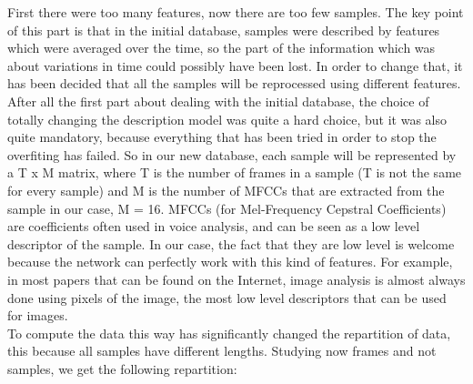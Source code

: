 \documentclass{report}
\begin{document}
	First there were too many features, now there are too few samples. The key point of this part is that in the initial database, samples were described by features which were averaged over the time, so the part of the information which was about variations in time could possibly have been lost. In order to change that, it has been decided that all the samples will be reprocessed using different features. After all the first part about dealing with the initial database, the choice of totally changing the description model was quite a hard choice, but it was also quite mandatory, because everything that has been tried in order to stop the overfiting has failed. So in our new database, each sample will be represented by a T x M matrix, where T is the number of frames in a sample (T is not the same for every sample) and M is the number of MFCCs that are extracted from the sample in our case, M = 16. MFCCs (for Mel-Frequency Cepstral Coefficients) are coefficients often used in voice analysis, and can be seen as a low level descriptor of the sample. In our case, the fact that they are low level is welcome because the network can perfectly work with this kind of features. For example, in most papers that can be found on the Internet, image analysis is almost always done using pixels of the image, the most low level descriptors that can be used for images.\\
	
	To compute the data this way has significantly changed the repartition of data, this because all samples have different lengths. Studying now frames and not samples, we get the following repartition:
	
\end{document}
